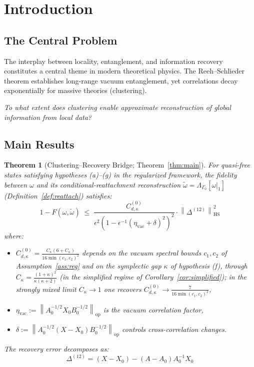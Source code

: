 \documentclass[11pt,a4paper]{article}
\theoremstyle{plain}
\newtheorem*{theorem*}{Theorem}
\theoremstyle{definition}
\theoremstyle{remark}
\newcommand{\opnorm}[1]{\left\lVert #1 \right\rVert_{\mathrm{op}}}
\newcommand{\hsnorm}[1]{\left\lVert #1 \right\rVert_{\mathrm{HS}}}
\newcommand{\etavac}{\eta_{\mathrm{vac}}}
\newcommand{\Ckappa}{C_{\kappa}}
\newcommand{\Cd}{C^{(0)}_{d,\kappa}}
\begin{document}
\section{Introduction}

\subsection{The Central Problem}

The interplay between locality, entanglement, and information recovery constitutes a
central theme in modern theoretical physics. The Reeh--Schlieder theorem establishes
long-range vacuum entanglement, yet correlations decay exponentially for massive
theories (clustering).
\begin{center}
\emph{To what extent does clustering enable approximate reconstruction of global
information from local data?}
\end{center}

\subsection{Main Results}

\begin{theorem*}[Clustering--Recovery Bridge; Theorem~\ref{thm:main}]
For quasi-free states satisfying hypotheses (a)--(g) in the regularized framework,
the fidelity between $\omega$ and its conditional-reattachment reconstruction
$\tilde{\omega} = \Lambda_{\Gamma_0}[\omega|_1]$ (Definition~\ref{def:reattach})
satisfies:
\begin{equation}
1 - F(\omega, \tilde{\omega}) \;\le\;
\frac{\Cd}{\epsilon^2 \left(1 - \epsilon^{-1}(\etavac + \delta)^2\right)^2}
\cdot \hsnorm{\Delta^{(12)}}^2
\end{equation}
where:
\begin{itemize}
\item $\Cd = \frac{\Ckappa(6+\Ckappa)}{16 \min(c_1,c_2)^2}$ depends on the vacuum
spectral bounds $c_1, c_2$ of Assumption~\ref{ass:reg} and on the symplectic gap
$\kappa$ of hypothesis (f), through $\Ckappa = \frac{(1+\kappa)^2}{\kappa(\kappa+2)}$
(in the simplified regime of Corollary~\ref{cor:simplified}); in the strongly mixed
limit $\Ckappa \to 1$ one recovers $\Cd \to \frac{7}{16\min(c_1,c_2)^2}$,
\item $\etavac := \opnorm{A_0^{-1/2} X_0 B_0^{-1/2}}$ is the vacuum correlation factor,
\item $\delta := \opnorm{A_0^{-1/2}(X - X_0)B_0^{-1/2}}$ controls cross-correlation
changes.
\end{itemize}
The recovery error decomposes as:
\begin{equation}
\Delta^{(12)} = (X - X_0) - (A - A_0)A_0^{-1}X_0
\end{equation}
\end{theorem*}
\end{document}
